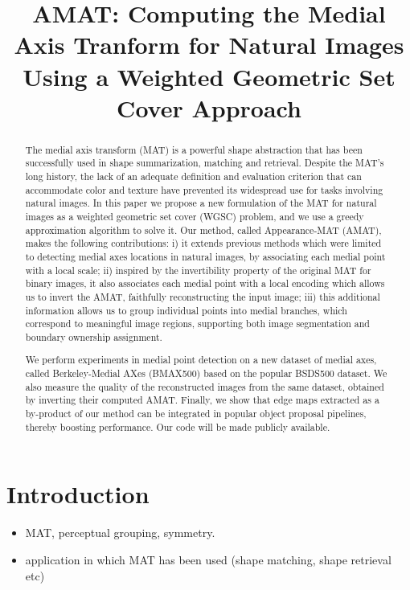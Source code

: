 \documentclass[10pt,twocolumn,letterpaper]{article}
\begin{document}
\title{AMAT: Computing the Medial Axis Tranform for Natural Images Using a Weighted Geometric Set Cover Approach}
\maketitle


\begin{abstract}
The medial axis transform (MAT) is a powerful shape abstraction that has been successfully
used in shape summarization, matching and retrieval. Despite the MAT's
long history, the lack of an adequate definition and evaluation criterion that can accommodate
color and texture have prevented its widespread use for tasks involving natural images.
In this paper we propose a new formulation of the
MAT for natural images as a weighted geometric set cover (WGSC) problem, and we use a greedy 
approximation algorithm to solve it.
Our method, called Appearance-MAT (AMAT), makes the following contributions: 
i) it extends previous methods which were limited to detecting medial axes locations 
in natural images, by associating  each medial point with a local scale; 
ii) inspired by the invertibility property of the 
original MAT for binary images, it also associates each medial point with a local encoding
which allows us to invert the AMAT, faithfully reconstructing the input image; 
iii) this additional information allows us to group individual points into medial branches,
which correspond to meaningful image regions, supporting both image segmentation and boundary
ownership assignment.

We perform experiments in medial point detection on a new dataset of medial axes, called
Berkeley-Medial AXes (BMAX500) based on the popular BSDS500 dataset. 
We also measure the quality of the reconstructed images from the same dataset,
obtained by inverting their computed AMAT. 
Finally, we show that edge maps extracted as a by-product of our method
can be integrated in popular object proposal pipelines, thereby boosting performance.
Our code will be made publicly available. 


\end{abstract}

\section{Introduction}\label{sec:introduction}
\begin{itemize}
\item MAT, perceptual grouping, symmetry.
\item application in which MAT has been used (shape matching, shape retrieval etc)
\end{itemize}
\end{document}
